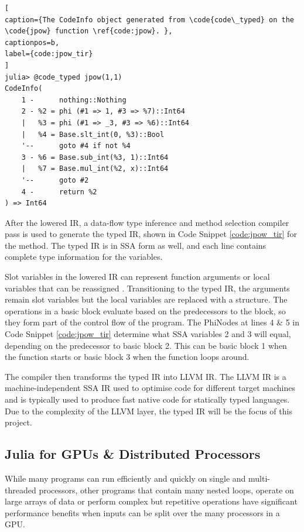 \pagebreak

\begin{lstlisting}[
caption={The CodeInfo object generated from \code{code\_typed} on the \code{jpow} function \ref{code:jpow}. },
captionpos=b, 
label={code:jpow_tir}
]
julia> @code_typed jpow(1,1)
CodeInfo(
    1 -      nothing::Nothing
    2 - %2 = phi (#1 => 1, #3 => %7)::Int64
    |   %3 = phi (#1 => _3, #3 => %6)::Int64
    |   %4 = Base.slt_int(0, %3)::Bool
    '--      goto #4 if not %4
    3 - %6 = Base.sub_int(%3, 1)::Int64
    |   %7 = Base.mul_int(%2, x)::Int64
    '--      goto #2
    4 -      return %2
) => Int64
\end{lstlisting}

After the lowered IR, a data-flow type inference and method selection compiler pass is used to generate the typed IR, shown in Code Snippet \ref{code:jpow_tir} for the  method. The typed IR is in SSA form as well, and each line contains complete type information for the variables.

Slot variables in the lowered IR can represent function arguments or local variables that can be reassigned \cite{ci_doc}. Transitioning to the typed IR, the arguments remain slot variables but the local variables are replaced with a  structure. The  operations in a basic block evaluate based on the predecessors to the block, so they form part of the control flow of the program. The PhiNodes at lines 4 \& 5 in Code Snippet \ref{code:jpow_tir} determine what SSA variables 2 and 3 will equal, depending on the predecessor to basic block 2. This can be basic block 1 when the function starts or basic block 3 when the function loops around.

The compiler then transforms the typed IR into LLVM IR. The LLVM IR is a machine-independent SSA IR used to optimise code for different target machines and is typically used to produce fast native code for statically typed languages. Due to the complexity of the LLVM layer, the typed IR will be the focus of this project.


\subsection{Julia for GPUs \& Distributed Processors}
While many programs can run efficiently and quickly on single and multi-threaded processors, other programs that contain many nested loops, operate on large arrays of data or perform complex but repetitive operations have significant performance benefits when inputs can be split over the many processors in a GPU. %

